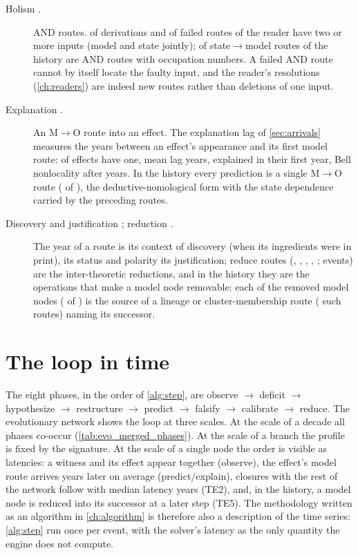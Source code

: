 \begin{description}
\item[Holism \citep{duhem1954,quine1951}.] AND routes. \EemDeriveAND{} of \EemDeriveTotal{} derivations and \EemFailedAND{} of \EemFailedTotal{} failed routes of the reader have two or more inputs (model and state jointly); \EhepEntersAND{} of \EhepEntersTotal{} state$\to$model routes of the history are AND routes with occupation numbers. A failed AND route cannot by itself locate the faulty input, and the reader's resolutions (\cref{ch:readers}) are indeed new routes rather than deletions of one input.
\item[Explanation \citep{hempel1948}.] An M$\to$O route into an effect. The explanation lag of \cref{sec:arrivals} measures the years between an effect's appearance and its first model route: \EgptEffectsWithM{} of \EgptEffects{} effects have one, mean lag \EgptLagMean{} years, \EgptLagZero{} explained in their first year, Bell nonlocality after \EgptLagBell{} years. In the history every prediction is a single M$\to$O route (\EhepPredictsMO{} of \EhepPredictsTotal{}), the deductive-nomological form with the state dependence carried by the preceding  routes.
\item[Discovery and justification \citep{reichenbach1938}; reduction \citep{nagel1961}.] The year of a route is its context of discovery (when its ingredients were in print), its status and polarity its justification; reduce routes (, , , , ; \Ephasereduce{} events) are the inter-theoretic reductions, and in the history they are the operations that make a model node removable: each of the \EhepRemovedModel{} removed model nodes (\EhepRemovedModelWithReduce{} of \EhepRemovedModel{}) is the source of a lineage or cluster-membership route (\EhepReduceRoutes{} such routes) naming its successor.
\end{description}

\section{The loop in time}
The eight phases, in the order of \cref{alg:step}, are observe $\to$ deficit $\to$ hypothesize $\to$ restructure $\to$ predict $\to$ falsify $\to$ calibrate $\to$ reduce. The evolutionary network shows the loop at three scales. At the scale of a decade all phases co-occur (\cref{tab:evo_merged_phases}). At the scale of a branch the profile is fixed by the signature. At the scale of a single node the order is visible as latencies: a witness and its effect appear together (observe), the effect's model route arrives \EgptLagMean{} years later on average (predict/explain), closures with the rest of the network follow with median latency \EGPTLatMedian{} years (TE2), and, in the history, a model node is reduced into its successor at a later step (TE5). The methodology written as an algorithm in \cref{ch:algorithm} is therefore also a description of the time series: \cref{alg:step} run once per event, with the solver's latency as the only quantity the engine does not compute.
